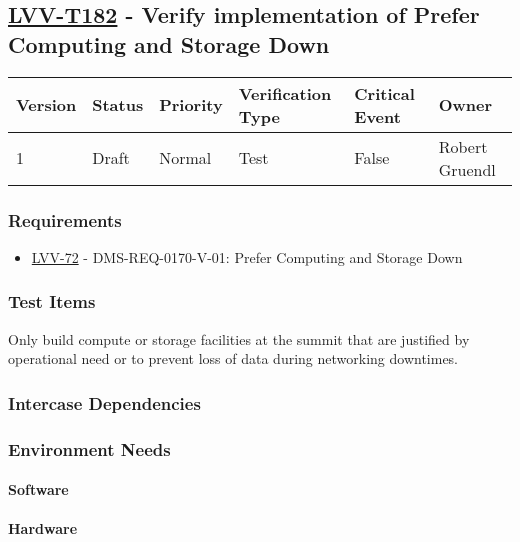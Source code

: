 \subsection{\href{https://jira.lsstcorp.org/secure/Tests.jspa\#/testCase/LVV-T182}{LVV-T182}
    - Verify implementation of Prefer Computing and Storage Down}\label{lvv-t182}

\begin{longtable}[]{llllll}
\toprule
Version & Status & Priority & Verification Type & Critical Event & Owner
\\\midrule
1 & Draft & Normal &
Test & False & Robert Gruendl
\\\bottomrule
\end{longtable}

\subsubsection{Requirements}
\begin{itemize}
\item \href{https://jira.lsstcorp.org/browse/LVV-72}{LVV-72} - DMS-REQ-0170-V-01: Prefer Computing and Storage Down
\end{itemize}

\subsubsection{Test Items}
Only build compute or storage facilities at the summit that are
justified by operational need or to prevent loss of data during
networking downtimes.



\subsubsection{Intercase Dependencies}

\subsubsection{Environment Needs}

\paragraph{Software}

\paragraph{Hardware}


